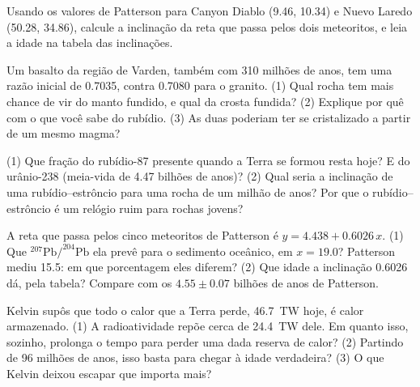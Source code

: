\begin{exercise}[$\star\star$]\label{exo:g12:age-of-the-earth:11}
Usando os valores de Patterson para Canyon Diablo (9.46, 10.34) e Nuevo
Laredo (50.28, 34.86), calcule a inclinação da reta que passa pelos dois
meteoritos, e leia a idade na tabela das inclinações.
\end{exercise}

\begin{exercise}[$\star\star\star$]\label{exo:g12:age-of-the-earth:12}
Um basalto da região de Varden, também com 310 milhões de anos, tem uma
razão inicial de 0.7035, contra 0.7080 para o granito. (1) Qual rocha tem
mais chance de vir do manto fundido, e qual da crosta fundida? (2) Explique
por quê com o que você sabe do rubídio. (3) As duas poderiam ter se
cristalizado a partir de um mesmo magma?
\end{exercise}

\begin{exercise}[$\star\star\star$]\label{exo:g12:age-of-the-earth:13}
(1) Que fração do rubídio-87 presente quando a Terra se formou resta hoje? E
do urânio-238 (meia-vida de 4.47 bilhões de anos)? (2) Qual seria a
inclinação de uma  rubídio--estrôncio para uma rocha de um milhão de
anos? Por que o rubídio--estrôncio é um relógio ruim para rochas jovens?
\end{exercise}

\begin{exercise}[$\star\star\star$]\label{exo:g12:age-of-the-earth:14}
A reta que passa pelos cinco meteoritos de Patterson é $y = 4.438 + 0.6026\,x$.
(1) Que $^{207}\mathrm{Pb}/^{204}\mathrm{Pb}$ ela prevê para o sedimento
oceânico, em $x = 19.0$? Patterson mediu 15.5: em que porcentagem eles
diferem? (2) Que idade a inclinação 0.6026 dá, pela tabela? Compare com os
$4.55 \pm 0.07$ bilhões de anos de Patterson.
\end{exercise}

\begin{exercise}[$\star\star\star$]\label{exo:g12:age-of-the-earth:15}
Kelvin supôs que todo o calor que a Terra perde, \qty{46.7}{TW} hoje, é
calor armazenado. (1) A radioatividade repõe cerca de \qty{24.4}{TW} dele.
Em quanto isso, sozinho, prolonga o tempo para perder uma dada reserva de
calor? (2) Partindo de 96 milhões de anos, isso basta para chegar à idade
verdadeira? (3) O que Kelvin deixou escapar que importa mais?
\end{exercise}

